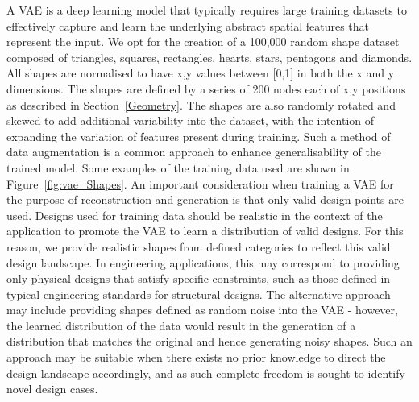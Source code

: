 \documentclass{article}
\begin{document}
A VAE is a deep learning model that typically requires large training datasets to effectively capture and learn the underlying abstract spatial features that represent the input.  We opt for the creation of a 100,000 random shape dataset composed of triangles, squares, rectangles, hearts, stars, pentagons and diamonds. All shapes are normalised to have x,y values between [0,1] in both the x and y dimensions. The shapes are defined by a series of 200 nodes each of x,y positions as described in Section~\ref{Geometry}. The shapes are also randomly rotated and skewed to add additional variability into the dataset, with the intention of expanding the variation of features present during training. Such a method of data augmentation is a common approach to enhance generalisability of the trained model. Some examples of the training data used are shown in Figure~\ref{fig:vae_Shapes}. An important consideration when training a VAE for the purpose of reconstruction and generation is that only valid design points are used. Designs used for training data should be realistic in the context of the application \citep{Huang2022}  to promote the VAE to learn a distribution of valid designs. For this reason, we provide realistic shapes from defined categories to reflect this valid design landscape. In engineering applications, this may correspond to providing only physical designs that satisfy specific constraints, such as those defined in typical engineering standards for structural designs. The alternative approach may include providing shapes defined as random noise into the VAE - however, the learned distribution of the data would result in the generation of a distribution that matches the original and hence generating noisy shapes. Such an approach may be suitable when there exists no prior knowledge to direct the design landscape accordingly, and as such complete freedom is sought to identify novel design cases.
\end{document}
